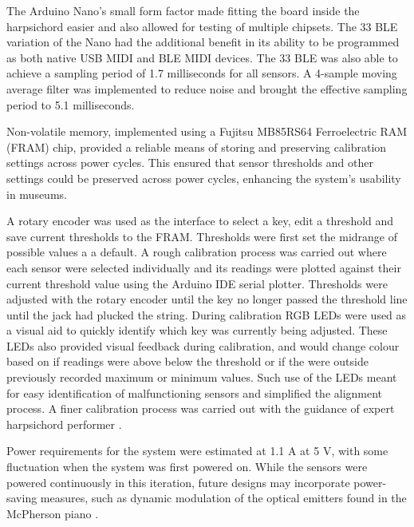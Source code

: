 The Arduino Nano's small form factor made fitting the board inside the
harpsichord easier and also allowed for testing of multiple chipsets. The 33 BLE
variation of the Nano had the additional benefit in its ability to be programmed
as both native USB MIDI and BLE MIDI devices. The 33 BLE was also able to
achieve a sampling period of 1.7 milliseconds for all sensors. A 4-sample moving
average filter was implemented to reduce noise and brought the effective
sampling period to 5.1 milliseconds.

Non-volatile memory, implemented using a Fujitsu MB85RS64 Ferroelectric RAM
(FRAM) chip, provided a reliable means of storing and preserving calibration
settings across power cycles. This ensured that sensor thresholds and other
settings could be preserved across power cycles, enhancing the system's
usability in museums.

A rotary encoder was used as the interface to select a key, edit a threshold and
save current thresholds to the FRAM. Thresholds were first set the midrange of
possible values a a default. A rough calibration process was carried out where
each sensor were selected individually and its readings were plotted against
their current threshold value using the Arduino IDE serial plotter. Thresholds
were adjusted with the rotary encoder until the key no longer passed the
threshold line until the jack had plucked the string. During calibration RGB
LEDs were used as a visual aid to quickly identify which key was currently being
adjusted. These LEDs also provided visual feedback during calibration, and would
change colour based on if readings were above below the threshold or if the were
outside previously recorded maximum or minimum values. Such use of the LEDs
meant for easy identification of malfunctioning sensors and simplified the
alignment process. A finer calibration process was carried out with the guidance
of expert harpsichord performer .

Power requirements for the system were estimated at 1.1 A at 5 V, with some
fluctuation when the system was first powered on. While the sensors were powered
continuously in this iteration, future designs may incorporate power-saving
measures, such as dynamic modulation of the optical emitters found in the
McPherson piano \cite{McPherson2013}.

